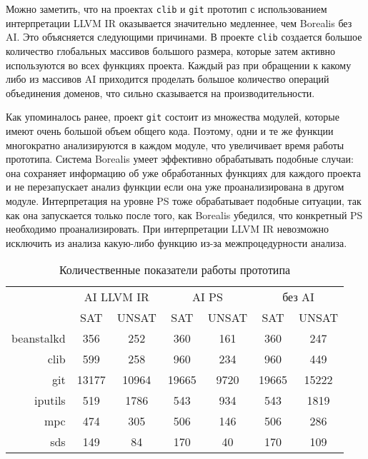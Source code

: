 Можно заметить, что на проектах \texttt{clib} и \texttt{git} прототип с 
использованием интерпретации LLVM IR оказывается значительно медленнее, чем
Borealis без AI. Это объясняется следующими причинами. В проекте \texttt{clib}
создается большое количество глобальных массивов большого размера, которые
затем активно используются во всех функциях проекта. Каждый раз при обращении
к какому либо из массивов AI приходится проделать большое количество операций
объединения доменов, что сильно сказывается на производительности.

Как упоминалось ранее, проект \texttt{git} состоит из множества модулей, 
которые имеют очень большой объем общего кода. Поэтому, одни и те же функции
многократно анализируются в каждом модуле, что увеличивает время работы 
прототипа. Система Borealis умеет эффективно обрабатывать подобные случаи: она
сохраняет информацию об уже обработанных функциях для каждого проекта и не 
перезапускает анализ функции если она уже проанализирована в другом модуле. 
Интерпретация на уровне PS тоже обрабатывает подобные ситуации, так как она
запускается только после того, как Borealis убедился, что конкретный PS 
необходимо проанализировать. При интерпретации LLVM IR невозможно исключить
из анализа какую-либо функцию из-за межпроцедурности анализа.

\begin{table}
\caption{Количественные показатели работы прототипа}
\centering
\begin{tabular}{|r|c|c|c|c|c|c|}
\hline
            \multirow{2}{*}{}
           & \multicolumn{2}{c|}{AI LLVM IR} 
           & \multicolumn{2}{c|}{AI PS} 
           & \multicolumn{2}{c|}{без AI} \\ \cline{2-7}
           & SAT    & UNSAT   & SAT    & UNSAT   & SAT    & UNSAT   \\ \hline
beanstalkd & 356    & 252     & 360    & 161     & 360    & 247     \\ \hline
clib       & 599    & 258     & 960    & 234     & 960    & 449     \\ \hline
git        & 13177  & 10964   & 19665  & 9720    & 19665  & 15222   \\ \hline
iputils    & 519    & 1786    & 543    & 934     & 543    & 1819    \\ \hline
mpc        & 474    & 305     & 506    & 146     & 506    & 286     \\ \hline
sds        & 149    & 84      & 170    & 40      & 170    & 109     \\ \hline
\end{tabular}
\label{table:checkResults}
\end{table}

